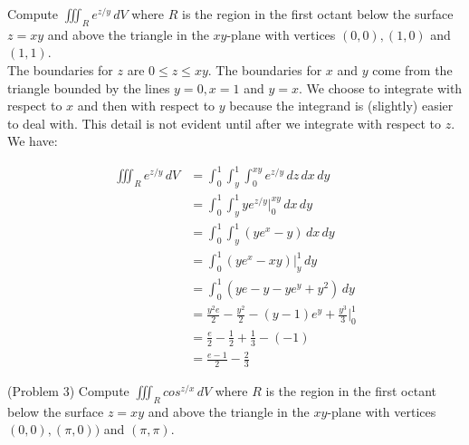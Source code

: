 \documentclass[handout]{ximera}
\begin{document}
\begin{example}[Example 3]
Compute $\iiint_R  e^{z/y} \, dV$ where $R$ is the region in the first octant below the 
surface $z = xy$ and above the triangle in the $xy$-plane with vertices $(0,0), (1,0)$ and $(1,1)$.\\


The boundaries for $z$ are $0 \leq z \leq xy$. The boundaries for $x$ and $y$ come from the triangle bounded by the lines
$y = 0, x = 1$ and $y = x$.  We choose to integrate with respect to $x$ and then with respect to $y$ because the
integrand is (slightly) easier to deal with.  This detail is not evident until after we integrate with respect to $z$.
We have:

\begin{align*}
\iiint_R e^{z/y} \, dV & = \int_0^1 \int_y^1 \int_0^{xy} e^{z/y} \, dz \, dx \, dy\\
                 & = \int_0^1 \int_y^1 ye^{z/y}\bigg|_{0}^{xy} \,dx \, dy\\
                 & = \int_0^1 \int_y^1 \left(ye^x - y\right) \,dx \, dy\\
                 &= \int_0^1 \left(ye^x - xy\right) \bigg|_y^1 \, dy\\
                 &= \int_0^1 \left(ye - y - ye^y + y^2\right) \, dy\\
                 &= \frac{y^2 e}{2} - \frac{y^2}{2} - (y-1)e^y + \frac{y^3}{3} \bigg|_0^1\\
                 &= \frac{e}{2} - \frac12 + \frac13 - (-1)\\
                 &= \frac{e-1}{2} - \frac23
\end{align*} 

\end{example}

\begin{problem}(Problem 3)
Compute $\iiint_R  cos^{z/x} \, dV$ where $R$ is the region in the first octant below the 
surface $z = xy$ and above the triangle in the $xy$-plane with vertices $(0,0), (\pi, 0))$ and $(\pi, \pi)$.\\
\end{problem}
\end{document}
